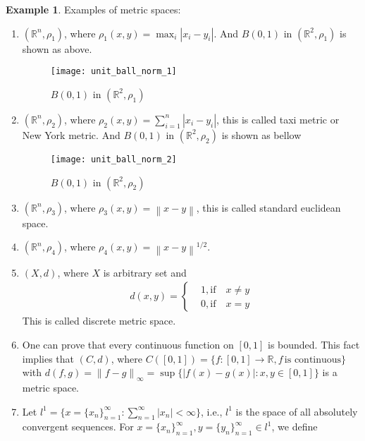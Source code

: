 \documentclass[12pt,leqno]{amsart}
\theoremstyle{definition}
\newtheorem{example}{Example}[section]
\numberwithin{equation}{subsection}
\begin{document}
\begin{example}
Examples of metric spaces:
\begin{enumerate}
    \item $(\mathbb{R}^n,\rho_1)$, where $\rho_1(x,y) = \max_i |x_i-y_i|$. And $B(0,1)$ in $(\mathbb{R}^2,\rho_1)$ is shown as above.\\
    \begin{figure}[h]
        \centering
        \texttt{[image: unit\_ball\_norm\_1]}
        \caption{$B(0,1)$ in $(\mathbb{R}^2,\rho_1)$}
        \label{fig:unit_ball_norm_1}
    \end{figure}
    \item $(\mathbb{R}^n,\rho_2)$, where $\rho_2(x,y) = \sum^n_{i=1} |x_i-y_i|$, this is called taxi metric or New York metric. And $B(0,1)$ in $(\mathbb{R}^2,\rho_2)$ is shown as bellow\\
    \begin{figure}[h]
        \centering
        \texttt{[image: unit\_ball\_norm\_2]}
        \caption{$B(0,1)$ in $(\mathbb{R}^2,\rho_2)$}
        \label{fig:unit_ball_norm_2}
    \end{figure}
    \item $(\mathbb{R}^n,\rho_3)$, where $\rho_3(x,y) = \left\|x-y\right\|$, this is called standard euclidean space.
    \item $(\mathbb{R}^n,\rho_4)$, where $\rho_4(x,y) = \left\|x-y\right\|^{1/2}$.
    \item $(X,d)$, where $X$ is arbitrary set and 
    \begin{align*}
        d(x,y) = \left\{
        \begin{aligned}
        & 1, \text{if} \quad x \neq y\\
        & 0, \text{if} \quad x = y
        \end{aligned}
        \right.
    \end{align*} 
    This is called discrete metric space.
    \item One can prove that every continuous function on $[0,1]$ is bounded. This fact implies that $(C,d)$, where $C([0,1]) = \{f:[0,1]\rightarrow \mathbb{R}, f \, \text{is continuous}\}$ with $d(f,g) = \left\|f-g\right\|_\infty = \sup \{|f(x) - g(x)|: x,y\in[0,1]\}$ is a metric space.
    \item Let $l^1 = \{x = \{x_n\}^\infty_{n=1}: \sum^\infty_{n=1}|x_n| < \infty\}$, i.e., $l^1$ is the space of all absolutely convergent sequences. For $x = \{x_n\}^\infty_{n=1}, y = \{y_n\}^\infty_{n=1} \in l^1$, we define 

\end{enumerate}
\end{example}
\end{document}
